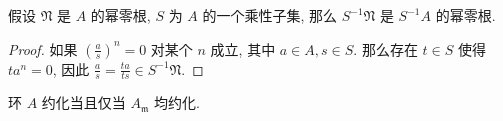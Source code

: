 \begin{proposition}
  假设 \( \mathfrak{N} \) 是 \( A \) 的幂零根, \( S \) 为 \( A \)
  的一个乘性子集, 那么 \( S^{-1}\mathfrak{N} \) 是 \( S^{-1}A \) 的幂零根.
\end{proposition}
\begin{proof}
  如果 \( (\frac{a}{s})^n = 0 \) 对某个 \( n \) 成立, 其中 \( a \in A, s \in S \).
  那么存在 \( t \in S \) 使得 \( ta^n = 0 \), 因此 \( \frac{a}{s} =
  \frac{ta}{ts} \in S^{-1} \mathfrak{N} \).
\end{proof}

\begin{corollary}
  环 \( A \) 约化当且仅当 \( A_{\mathfrak{m}} \) 均约化.
\end{corollary}


